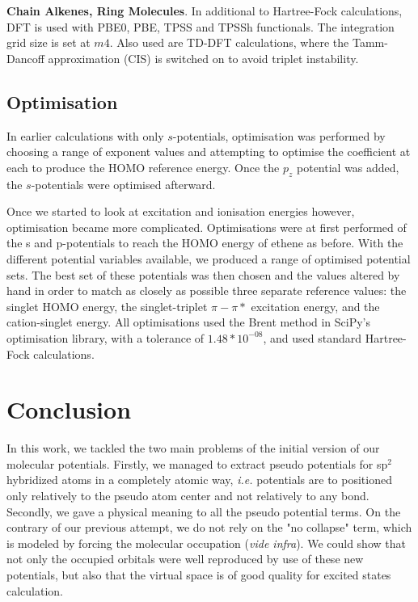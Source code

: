 \documentclass[journal=jctcce,manuscript=article]{achemso}
\begin{document}
\textbf{Chain Alkenes, Ring Molecules}. In additional to Hartree-Fock calculations, DFT is used with PBE0, PBE, TPSS and TPSSh functionals. \cite{pbe0,pbe,tpss,tpssh} The integration grid size is set at \(m4\). Also used are TD-DFT calculations, where the Tamm-Dancoff approximation (CIS) \cite{tammdancoff} is switched on to avoid triplet instability.

\subsection{Optimisation}

In earlier calculations with only \(s\)-potentials, optimisation was performed by choosing a range of exponent values and attempting to optimise the coefficient at each to produce the HOMO reference energy. Once the \(p_{z}\) potential was added, the \(s\)-potentials were optimised afterward. 

Once we started to look at excitation and ionisation energies however, optimisation became more complicated. Optimisations were at first performed of the s and p-potentials to reach the HOMO energy of ethene as before. With the different potential variables available, we produced a range of optimised potential sets. The best set of these potentials was then chosen and the values altered by hand in order to match as closely as possible three separate reference values: the singlet HOMO energy, the singlet-triplet \(\pi-\pi*\) excitation energy, and the cation-singlet energy. All optimisations used the Brent method in SciPy's optimisation library, with a tolerance of \(1.48*10^{-08}\), and used standard Hartree-Fock calculations.\cite{scipy}

\section{Conclusion}
In this work, we tackled the two main problems of the initial version of our
molecular potentials.
Firstly, we managed to extract pseudo potentials for sp$^2$ hybridized
atoms in a completely atomic way, \emph{i.e.} potentials
are to positioned only relatively to the pseudo atom center and not
relatively to any bond.
Secondly, we gave a physical meaning to all the pseudo potential
terms.
On the contrary of our previous attempt, we do not rely on the "no collapse" term,
which is modeled by forcing the molecular occupation (\emph{vide infra}).
We could show that not only the occupied orbitals were well reproduced
by use of these new potentials, but also that the virtual space is of good quality
for excited states calculation.
\end{document}
